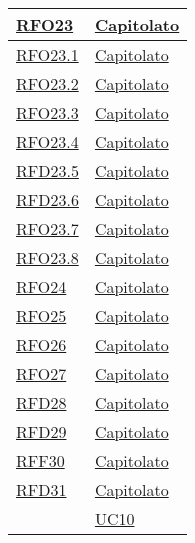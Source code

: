 \begin{longtable}{|>{\centering}m{5cm}|m{5cm}<{\centering}|}
\hyperlink{RFO23}{RFO23} & \hyperlink{Capitolato}{Capitolato}\\ \hline

\hyperlink{RFO23.1}{RFO23.1} & \hyperlink{Capitolato}{Capitolato}\\ \hline

\hyperlink{RFO23.2}{RFO23.2} & \hyperlink{Capitolato}{Capitolato}\\ \hline

\hyperlink{RFO23.3}{RFO23.3} & \hyperlink{Capitolato}{Capitolato}\\ \hline

\hyperlink{RFO23.4}{RFO23.4} & \hyperlink{Capitolato}{Capitolato}\\ \hline

\hyperlink{RFD23.5}{RFD23.5} & \hyperlink{Capitolato}{Capitolato}\\ \hline

\hyperlink{RFD23.6}{RFD23.6} & \hyperlink{Capitolato}{Capitolato}\\ \hline

\hyperlink{RFO23.7}{RFO23.7} & \hyperlink{Capitolato}{Capitolato}\\ \hline

\hyperlink{RFO23.8}{RFO23.8} & \hyperlink{Capitolato}{Capitolato}\\ \hline

\hyperlink{RFO24}{RFO24} & \hyperlink{Capitolato}{Capitolato}\\ \hline

\hyperlink{RFO25}{RFO25} & \hyperlink{Capitolato}{Capitolato}\\ \hline

\hyperlink{RFO26}{RFO26} & \hyperlink{Capitolato}{Capitolato}\\ \hline

\hyperlink{RFO27}{RFO27} & \hyperlink{Capitolato}{Capitolato}\\ \hline

\hyperlink{RFD28}{RFD28} & \hyperlink{Capitolato}{Capitolato}\\ \hline

\hyperlink{RFD29}{RFD29} & \hyperlink{Capitolato}{Capitolato}\\ \hline

\hyperlink{RFF30}{RFF30} & \hyperlink{Capitolato}{Capitolato}\\ \hline

\hyperlink{RFD31}{RFD31} & \hyperlink{Capitolato}{Capitolato}\\
& \hyperref[UC10]{UC10}\\ \hline


\end{longtable}
